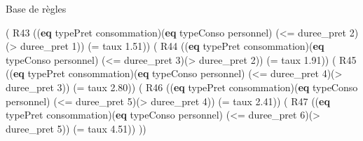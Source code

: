 \documentclass[
  ignorenonframetext,
]{beamer}
\newenvironment{Shaded}{}{}
\newcommand{\DecValTok}[1]{\textcolor[rgb]{0.25,0.63,0.44}{#1}}
\newcommand{\FloatTok}[1]{\textcolor[rgb]{0.25,0.63,0.44}{#1}}
\newcommand{\KeywordTok}[1]{\textcolor[rgb]{0.00,0.44,0.13}{\textbf{#1}}}
\newcommand{\NormalTok}[1]{#1}
\newcommand{\OperatorTok}[1]{\textcolor[rgb]{0.40,0.40,0.40}{#1}}
\begin{document}
\begin{frame}[fragile]{Base de règles}
\protect\hypertarget{base-de-ruxe8gles-5}{}
\begin{Shaded}
\begin{Highlighting}[]
\NormalTok{( R43 ((}\KeywordTok{eq}\NormalTok{ typePret consommation)(}\KeywordTok{eq}\NormalTok{ typeConso personnel)}
\NormalTok{        (}\OperatorTok{\textless{}=}\NormalTok{ duree\_pret }\DecValTok{2}\NormalTok{)(}\OperatorTok{\textgreater{}}\NormalTok{ duree\_pret }\DecValTok{1}\NormalTok{)) (}\OperatorTok{=}\NormalTok{ taux }\FloatTok{1.51}\NormalTok{))}
\NormalTok{( R44 ((}\KeywordTok{eq}\NormalTok{ typePret consommation)(}\KeywordTok{eq}\NormalTok{ typeConso personnel)}
\NormalTok{        (}\OperatorTok{\textless{}=}\NormalTok{ duree\_pret }\DecValTok{3}\NormalTok{)(}\OperatorTok{\textgreater{}}\NormalTok{ duree\_pret }\DecValTok{2}\NormalTok{)) (}\OperatorTok{=}\NormalTok{ taux }\FloatTok{1.91}\NormalTok{))}
\NormalTok{( R45 ((}\KeywordTok{eq}\NormalTok{ typePret consommation)(}\KeywordTok{eq}\NormalTok{ typeConso personnel)}
\NormalTok{        (}\OperatorTok{\textless{}=}\NormalTok{ duree\_pret }\DecValTok{4}\NormalTok{)(}\OperatorTok{\textgreater{}}\NormalTok{ duree\_pret }\DecValTok{3}\NormalTok{)) (}\OperatorTok{=}\NormalTok{ taux }\FloatTok{2.80}\NormalTok{))}
\NormalTok{( R46 ((}\KeywordTok{eq}\NormalTok{ typePret consommation)(}\KeywordTok{eq}\NormalTok{ typeConso personnel)}
\NormalTok{        (}\OperatorTok{\textless{}=}\NormalTok{ duree\_pret }\DecValTok{5}\NormalTok{)(}\OperatorTok{\textgreater{}}\NormalTok{ duree\_pret }\DecValTok{4}\NormalTok{)) (}\OperatorTok{=}\NormalTok{ taux }\FloatTok{2.41}\NormalTok{))}
\NormalTok{( R47 ((}\KeywordTok{eq}\NormalTok{ typePret consommation)(}\KeywordTok{eq}\NormalTok{ typeConso personnel)}
\NormalTok{        (}\OperatorTok{\textless{}=}\NormalTok{ duree\_pret }\DecValTok{6}\NormalTok{)(}\OperatorTok{\textgreater{}}\NormalTok{ duree\_pret }\DecValTok{5}\NormalTok{)) (}\OperatorTok{=}\NormalTok{ taux }\FloatTok{4.51}\NormalTok{))}
\NormalTok{))}
\end{Highlighting}
\end{Shaded}
\end{frame}
\end{document}
